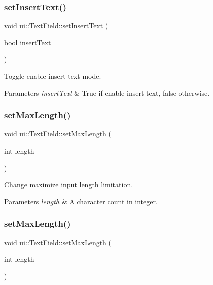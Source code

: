 \subsubsection{\texorpdfstring{set\+Insert\+Text()}{setInsertText()}\hspace{0.1cm}{\footnotesize\ttfamily [2/2]}}
{\footnotesize\ttfamily void ui\+::\+Text\+Field\+::set\+Insert\+Text (\begin{DoxyParamCaption}\item[{bool}]{insert\+Text }\end{DoxyParamCaption})}



Toggle enable insert text mode. 


\begin{DoxyParams}{Parameters}
{\em insert\+Text} & True if enable insert text, false otherwise. \\
\hline
\end{DoxyParams}
\mbox{\label{classui_1_1TextField_ad952090257800bf298acb875d4462c0a}} 
\subsubsection{\texorpdfstring{set\+Max\+Length()}{setMaxLength()}\hspace{0.1cm}{\footnotesize\ttfamily [1/2]}}
{\footnotesize\ttfamily void ui\+::\+Text\+Field\+::set\+Max\+Length (\begin{DoxyParamCaption}\item[{int}]{length }\end{DoxyParamCaption})}



Change maximize input length limitation. 


\begin{DoxyParams}{Parameters}
{\em length} & A character count in integer. \\
\hline
\end{DoxyParams}
\mbox{\label{classui_1_1TextField_ad952090257800bf298acb875d4462c0a}} 
\subsubsection{\texorpdfstring{set\+Max\+Length()}{setMaxLength()}\hspace{0.1cm}{\footnotesize\ttfamily [2/2]}}
{\footnotesize\ttfamily void ui\+::\+Text\+Field\+::set\+Max\+Length (\begin{DoxyParamCaption}\item[{int}]{length }\end{DoxyParamCaption})}



